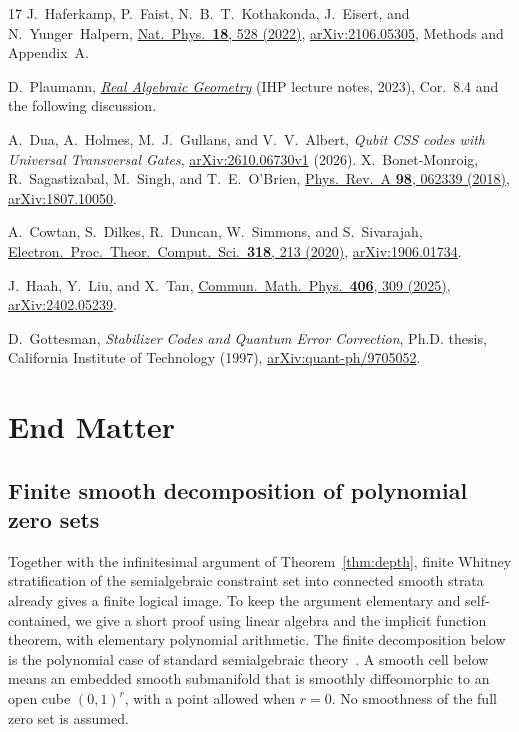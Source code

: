 \documentclass[aps,prl,reprint,notitlepage,nofootinbib,nobibnotes]{revtex4-2}
\begin{document}
\begin{thebibliography}{17}
J.~Haferkamp, P.~Faist, N.~B.~T.~Kothakonda, J.~Eisert, and
N.~Yunger~Halpern,
\href{https://doi.org/10.1038/s41567-022-01539-6}
{Nat.\ Phys.\ \textbf{18}, 528 (2022)},
\href{https://arxiv.org/abs/2106.05305}{arXiv:2106.05305},
Methods and Appendix~A.

D.~Plaumann,
\href{https://wwwold.mathematik.tu-dortmund.de/~dplauman/notes/rag-ihp.pdf}
{\emph{Real Algebraic Geometry}}
(IHP lecture notes, 2023), Cor.~8.4 and the following discussion.

A.~Dua, A.~Holmes, M.~J.~Gullans, and V.~V.~Albert,
\emph{Qubit CSS codes with Universal Transversal Gates},
\href{https://arxiv.org/abs/2610.06730v1}{arXiv:2610.06730v1} (2026).
X.~Bonet-Monroig, R.~Sagastizabal, M.~Singh, and T.~E.~O'Brien,
\href{https://doi.org/10.1103/PhysRevA.98.062339}
{Phys.\ Rev.\ A \textbf{98}, 062339 (2018)},
\href{https://arxiv.org/abs/1807.10050}{arXiv:1807.10050}.

A.~Cowtan, S.~Dilkes, R.~Duncan, W.~Simmons, and S.~Sivarajah,
\href{https://doi.org/10.4204/EPTCS.318.13}
{Electron.\ Proc.\ Theor.\ Comput.\ Sci.\ \textbf{318}, 213 (2020)},
\href{https://arxiv.org/abs/1906.01734}{arXiv:1906.01734}.

J.~Haah, Y.~Liu, and X.~Tan,
\href{https://doi.org/10.1007/s00220-025-05480-6}
{Commun.\ Math.\ Phys.\ \textbf{406}, 309 (2025)},
\href{https://arxiv.org/abs/2402.05239}{arXiv:2402.05239}.

D.~Gottesman,
\emph{Stabilizer Codes and Quantum Error Correction},
Ph.D. thesis, California Institute of Technology (1997),
\href{https://arxiv.org/abs/quant-ph/9705052}{arXiv:quant-ph/9705052}.

\end{thebibliography}

\section*{End Matter}
\subsection*{Finite smooth decomposition of polynomial zero sets}

Together with the infinitesimal argument of Theorem~\ref{thm:depth},
finite Whitney stratification of the semialgebraic constraint set into
connected smooth strata already gives a finite logical image.
To keep the argument elementary and self-contained, we give a short proof
using linear algebra and the implicit function theorem, with elementary
polynomial arithmetic. The finite decomposition below is the polynomial
case of standard semialgebraic theory~\cite{Plaumann}.
A smooth cell below means an
embedded smooth submanifold that is smoothly diffeomorphic to an open
cube \((0,1)^r\), with a point allowed
when \(r=0\). No smoothness of the full zero set is assumed.
\end{document}
